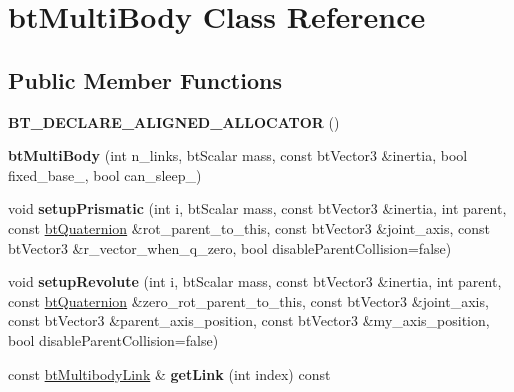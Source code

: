\hypertarget{classbtMultiBody}{}\section{bt\+Multi\+Body Class Reference}
\label{classbtMultiBody}
\subsection*{Public Member Functions}
\begin{DoxyCompactItemize}
\item 
\mbox{\label{classbtMultiBody_a607c1ece0fdf16a6d32ac8eafd91976e}} 
{\bfseries B\+T\+\_\+\+D\+E\+C\+L\+A\+R\+E\+\_\+\+A\+L\+I\+G\+N\+E\+D\+\_\+\+A\+L\+L\+O\+C\+A\+T\+OR} ()
\item 
\mbox{\label{classbtMultiBody_ab221797839166ac108b3878c3a823768}} 
{\bfseries bt\+Multi\+Body} (int n\+\_\+links, bt\+Scalar mass, const bt\+Vector3 \&inertia, bool fixed\+\_\+base\+\_\+, bool can\+\_\+sleep\+\_\+)
\item 
\mbox{\label{classbtMultiBody_ad9921754c20a1de7fbc4dfe82e3ccba2}} 
void {\bfseries setup\+Prismatic} (int i, bt\+Scalar mass, const bt\+Vector3 \&inertia, int parent, const \hyperlink{classbtQuaternion}{bt\+Quaternion} \&rot\+\_\+parent\+\_\+to\+\_\+this, const bt\+Vector3 \&joint\+\_\+axis, const bt\+Vector3 \&r\+\_\+vector\+\_\+when\+\_\+q\+\_\+zero, bool disable\+Parent\+Collision=false)
\item 
\mbox{\label{classbtMultiBody_a90726123e71ab232653365aa4ef3d18b}} 
void {\bfseries setup\+Revolute} (int i, bt\+Scalar mass, const bt\+Vector3 \&inertia, int parent, const \hyperlink{classbtQuaternion}{bt\+Quaternion} \&zero\+\_\+rot\+\_\+parent\+\_\+to\+\_\+this, const bt\+Vector3 \&joint\+\_\+axis, const bt\+Vector3 \&parent\+\_\+axis\+\_\+position, const bt\+Vector3 \&my\+\_\+axis\+\_\+position, bool disable\+Parent\+Collision=false)
\item 
\mbox{\label{classbtMultiBody_a9527f50e23482689fb658d48b54e8c9c}} 
const \hyperlink{structbtMultibodyLink}{bt\+Multibody\+Link} \& {\bfseries get\+Link} (int index) const
\item 
\mbox{\label{classbtMultiBody_a780d83915c460c1a17f098d47b2c8df2}} 

\end{DoxyCompactItemize}
